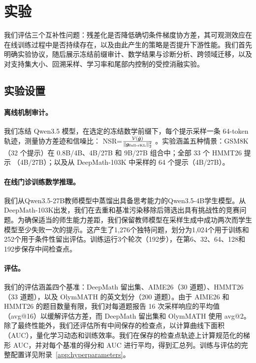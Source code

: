 \section{实验}
\label{sec:experiments}

我们评估三个互补性问题：残差化是否降低确切条件梯度协方差，其可观测效应在在线训练过程中是否持续存在，以及由此产生的策略是否提升下游性能。我们首先明确实验协议，随后展示冻结前缀审计、数学结果与诊断分析、跨领域迁移，以及对支持集大小、回溯采样、学习率和尾部内控制的受控消融实验。

\subsection{实验设置}
\label{sec:ex-setup}

\paragraph{离线机制审计。}
我们冻结 Qwen3.5 \citep{qwen3.5} 模型，在选定的冻结数学前缀下，每个提示采样一条 64-token 轨迹，测量协方差迹和信噪比：
NSR=$\frac{\mathcal{V}(\hat{\bm{g}})}{\|\bm{g}_{\text{full-rKL}}\|_2^2}$ 。实验涵盖五种情景：GSM8K \citep{cobbe2021gsm8k}（32 个提示）在 0.8B/4B、4B/27B 和 9B/27B 组合中；全部 33 个 HMMT26 提示 \citep{dekoninck2026matharena}（4B/27B）；以及从 DeepMath-103K \citep{deepmath} 中采样的 64 个提示（4B/27B）。

\paragraph{在线门诊训练数学推理。}
我们从Qwen3.5-27B教师模型中蒸馏出具备思考能力的Qwen3.5-4B学生模型。从DeepMath-103K出发，我们在去重和基准污染移除后筛选出具有挑战性的竞赛问题。为确保适当的师生能力差距，我们保留教师模型在采样生成中成功两次而学生模型至少失败一次的提示。这产生了1,276个独特问题，划分为1,024个用于训练和252个用于条件性留出评估。训练运行3个轮次（192步），在第6、32、64、128和192步保存中间检查点。
\vspace{-4mm}

\paragraph{评估。}
我们的评估涵盖四个基准：DeepMath 留出集、AIME26（30 道题）\citep{aime26}、HMMT26（33 道题）\citep{dekoninck2026matharena}，以及 OlymMATH 的英文划分（200 道题）\citep{sun2025challengingboundariesreasoningolympiadlevel}。由于 AIME26 和 HMMT26 的题目数量有限，我们对每道题报告 16 次采样响应的平均值（avg@16）以缓解评估方差，而 DeepMath 留出集和 OlymMATH 使用 avg@2。除了最终性能外，我们还评估所有中间保存的检查点，以计算曲线下面积（AUC），量化学习动态和训练效率。我们在保存的检查点轨迹上计算规范化的梯形 AUC，并对每个基准的得分和 AUC 进行平均，得到汇总列。训练与评估的完整配置详见附录~\ref{app:hyperparameters}。
\vspace{-4mm}

